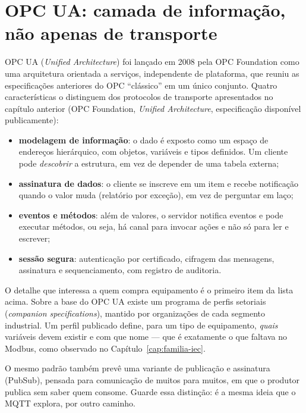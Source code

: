 
\section{OPC UA: camada de informação, não apenas de transporte}

OPC UA (\emph{Unified Architecture}) foi lançado em 2008 pela OPC Foundation como uma arquitetura
orientada a serviços, independente de plataforma, que reuniu as especificações anteriores do OPC
``clássico'' em um único conjunto. Quatro características o distinguem dos protocolos de transporte
apresentados no capítulo anterior (OPC Foundation, \emph{Unified Architecture}, especificação
disponível publicamente):

\begin{itemize}
  \item \textbf{modelagem de informação}: o dado é exposto como um espaço de endereços hierárquico,
        com objetos, variáveis e tipos definidos. Um cliente pode \emph{descobrir} a estrutura, em
        vez de depender de uma tabela externa;
  \item \textbf{assinatura de dados}: o cliente se inscreve em um item e recebe notificação quando o
        valor muda (relatório por exceção), em vez de perguntar em laço;
  \item \textbf{eventos e métodos}: além de valores, o servidor notifica eventos e pode executar
        métodos, ou seja, há canal para invocar ações e não só para ler e escrever;
  \item \textbf{sessão segura}: autenticação por certificado, cifragem das mensagens, assinatura e
        sequenciamento, com registro de auditoria.
\end{itemize}

O detalhe que interessa a quem compra equipamento é o primeiro item da lista acima. Sobre a base do
OPC UA existe um programa de perfis setoriais (\emph{companion specifications}), mantido por
organizações de cada segmento industrial. Um perfil publicado define, para um tipo de equipamento,
\emph{quais} variáveis devem existir e com que nome --- que é exatamente o que faltava no Modbus, como
observado no Capítulo~\ref{cap:familia-iec}.

O mesmo padrão também prevê uma variante de publicação e assinatura (PubSub), pensada para
comunicação de muitos para muitos, em que o produtor publica sem saber quem consome. Guarde essa
distinção: é a mesma ideia que o MQTT explora, por outro caminho.

